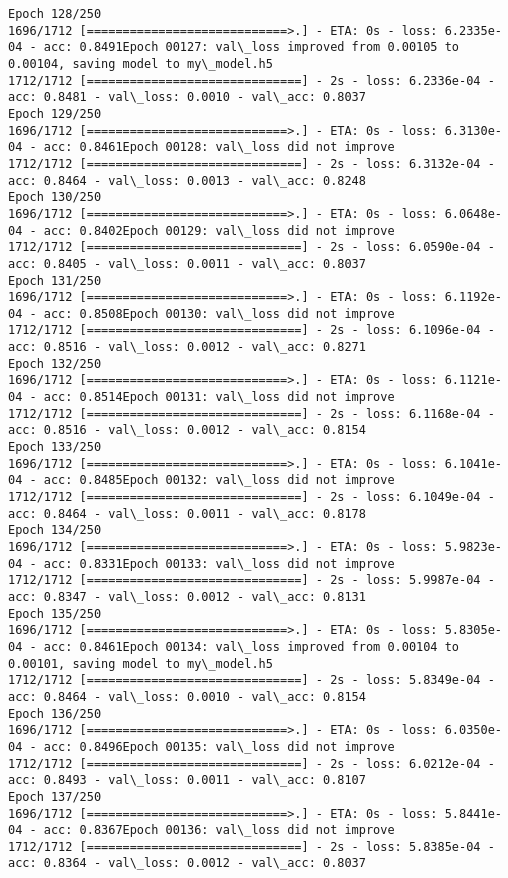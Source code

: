 \documentclass[11pt]{article}
\begin{document}
\begin{Verbatim}[commandchars=\\\{\}]
Epoch 128/250
1696/1712 [============================>.] - ETA: 0s - loss: 6.2335e-04 - acc: 0.8491Epoch 00127: val\_loss improved from 0.00105 to 0.00104, saving model to my\_model.h5
1712/1712 [==============================] - 2s - loss: 6.2336e-04 - acc: 0.8481 - val\_loss: 0.0010 - val\_acc: 0.8037
Epoch 129/250
1696/1712 [============================>.] - ETA: 0s - loss: 6.3130e-04 - acc: 0.8461Epoch 00128: val\_loss did not improve
1712/1712 [==============================] - 2s - loss: 6.3132e-04 - acc: 0.8464 - val\_loss: 0.0013 - val\_acc: 0.8248
Epoch 130/250
1696/1712 [============================>.] - ETA: 0s - loss: 6.0648e-04 - acc: 0.8402Epoch 00129: val\_loss did not improve
1712/1712 [==============================] - 2s - loss: 6.0590e-04 - acc: 0.8405 - val\_loss: 0.0011 - val\_acc: 0.8037
Epoch 131/250
1696/1712 [============================>.] - ETA: 0s - loss: 6.1192e-04 - acc: 0.8508Epoch 00130: val\_loss did not improve
1712/1712 [==============================] - 2s - loss: 6.1096e-04 - acc: 0.8516 - val\_loss: 0.0012 - val\_acc: 0.8271
Epoch 132/250
1696/1712 [============================>.] - ETA: 0s - loss: 6.1121e-04 - acc: 0.8514Epoch 00131: val\_loss did not improve
1712/1712 [==============================] - 2s - loss: 6.1168e-04 - acc: 0.8516 - val\_loss: 0.0012 - val\_acc: 0.8154
Epoch 133/250
1696/1712 [============================>.] - ETA: 0s - loss: 6.1041e-04 - acc: 0.8485Epoch 00132: val\_loss did not improve
1712/1712 [==============================] - 2s - loss: 6.1049e-04 - acc: 0.8464 - val\_loss: 0.0011 - val\_acc: 0.8178
Epoch 134/250
1696/1712 [============================>.] - ETA: 0s - loss: 5.9823e-04 - acc: 0.8331Epoch 00133: val\_loss did not improve
1712/1712 [==============================] - 2s - loss: 5.9987e-04 - acc: 0.8347 - val\_loss: 0.0012 - val\_acc: 0.8131
Epoch 135/250
1696/1712 [============================>.] - ETA: 0s - loss: 5.8305e-04 - acc: 0.8461Epoch 00134: val\_loss improved from 0.00104 to 0.00101, saving model to my\_model.h5
1712/1712 [==============================] - 2s - loss: 5.8349e-04 - acc: 0.8464 - val\_loss: 0.0010 - val\_acc: 0.8154
Epoch 136/250
1696/1712 [============================>.] - ETA: 0s - loss: 6.0350e-04 - acc: 0.8496Epoch 00135: val\_loss did not improve
1712/1712 [==============================] - 2s - loss: 6.0212e-04 - acc: 0.8493 - val\_loss: 0.0011 - val\_acc: 0.8107
Epoch 137/250
1696/1712 [============================>.] - ETA: 0s - loss: 5.8441e-04 - acc: 0.8367Epoch 00136: val\_loss did not improve
1712/1712 [==============================] - 2s - loss: 5.8385e-04 - acc: 0.8364 - val\_loss: 0.0012 - val\_acc: 0.8037

\end{Verbatim}
\end{document}
